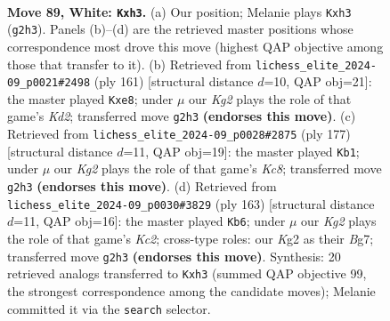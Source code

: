 \documentclass[11pt]{article}
\begin{document}
\clearpage

\begin{figure}[p]\centering
\begin{subfigure}{0.46\textwidth}\centering
\resizebox{\linewidth}{!}{%
\newchessgame
\chessboard[
  setfen={8/8/8/2p1k3/3p4/7r/p5K1/8 w - - 0 89},
  showmover=false,
  pgfstyle=straightmove, color=movearrow, markmove={g2-h3}
]}
\caption{}
\end{subfigure}\hfill
\begin{subfigure}{0.46\textwidth}\centering
\resizebox{\linewidth}{!}{%
\newchessgame
\chessboard[
  setfen={4R3/3k4/8/5P2/5K2/8/8/8 b - - 0 81},
  showmover=false,
  pgfstyle=straightmove, color=movearrow, markmove={d7-e8}
]}
\caption{}
\end{subfigure}
\\[4pt]
\begin{subfigure}{0.46\textwidth}\centering
\resizebox{\linewidth}{!}{%
\newchessgame
\chessboard[
  setfen={8/4PPPP/8/8/8/4K3/3R4/2k5 b - - 6 89},
  showmover=false,
  pgfstyle=straightmove, color=movearrow, markmove={c1-b1}
]}
\caption{}
\end{subfigure}\hfill
\begin{subfigure}{0.46\textwidth}\centering
\resizebox{\linewidth}{!}{%
\newchessgame
\chessboard[
  setfen={7R/2k2Pb1/4K3/8/8/8/8/8 b - - 2 82},
  showmover=false,
  pgfstyle=straightmove, color=movearrow, markmove={c7-b6}
]}
\caption{}
\end{subfigure}
\caption{\textbf{Move 89, White: \texttt{Kxh3}.} (a) Our position; Melanie plays \texttt{Kxh3} (\texttt{g2h3}). Panels (b)--(d) are the retrieved master positions whose correspondence most drove this move (highest QAP objective among those that transfer to it). (b) Retrieved from \texttt{lichess\_elite\_2024-09\_p0021\#2498} (ply 161) [structural distance $d$=10, QAP obj=21]: the master played \texttt{Kxe8}; under $\mu$ our \emph{Kg2} plays the role of that game's \emph{Kd2}; transferred move \texttt{g2h3} \textbf{(endorses this move)}. (c) Retrieved from \texttt{lichess\_elite\_2024-09\_p0028\#2875} (ply 177) [structural distance $d$=11, QAP obj=19]: the master played \texttt{Kb1}; under $\mu$ our \emph{Kg2} plays the role of that game's \emph{Kc8}; transferred move \texttt{g2h3} \textbf{(endorses this move)}. (d) Retrieved from \texttt{lichess\_elite\_2024-09\_p0030\#3829} (ply 163) [structural distance $d$=11, QAP obj=16]: the master played \texttt{Kb6}; under $\mu$ our \emph{Kg2} plays the role of that game's \emph{Kc2}; cross-type roles: our \emph{K}g2 as their \emph{B}g7; transferred move \texttt{g2h3} \textbf{(endorses this move)}. Synthesis: 20 retrieved analogs transferred to \texttt{Kxh3} (summed QAP objective 99, the strongest correspondence among the candidate moves); Melanie committed it via the \texttt{search} selector.}
\label{fig:thought-m176}
\end{figure}
\end{document}
